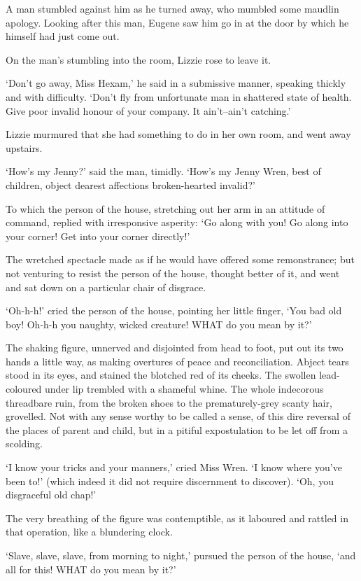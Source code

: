 A man stumbled against him as he turned away, who mumbled some maudlin
apology. Looking after this man, Eugene saw him go in at the door by
which he himself had just come out.

On the man’s stumbling into the room, Lizzie rose to leave it.

‘Don’t go away, Miss Hexam,’ he said in a submissive manner, speaking
thickly and with difficulty. ‘Don’t fly from unfortunate man in
shattered state of health. Give poor invalid honour of your company. It
ain’t--ain’t catching.’

Lizzie murmured that she had something to do in her own room, and went
away upstairs.

‘How’s my Jenny?’ said the man, timidly. ‘How’s my Jenny Wren, best of
children, object dearest affections broken-hearted invalid?’

To which the person of the house, stretching out her arm in an attitude
of command, replied with irresponsive asperity: ‘Go along with you! Go
along into your corner! Get into your corner directly!’

The wretched spectacle made as if he would have offered some
remonstrance; but not venturing to resist the person of the house,
thought better of it, and went and sat down on a particular chair of
disgrace.

‘Oh-h-h!’ cried the person of the house, pointing her little finger,
‘You bad old boy! Oh-h-h you naughty, wicked creature! WHAT do you mean
by it?’

The shaking figure, unnerved and disjointed from head to foot, put
out its two hands a little way, as making overtures of peace and
reconciliation. Abject tears stood in its eyes, and stained the blotched
red of its cheeks. The swollen lead-coloured under lip trembled with a
shameful whine. The whole indecorous threadbare ruin, from the broken
shoes to the prematurely-grey scanty hair, grovelled. Not with any sense
worthy to be called a sense, of this dire reversal of the places of
parent and child, but in a pitiful expostulation to be let off from a
scolding.

‘I know your tricks and your manners,’ cried Miss Wren. ‘I know where
you’ve been to!’ (which indeed it did not require discernment to
discover). ‘Oh, you disgraceful old chap!’

The very breathing of the figure was contemptible, as it laboured and
rattled in that operation, like a blundering clock.

‘Slave, slave, slave, from morning to night,’ pursued the person of the
house, ‘and all for this! WHAT do you mean by it?’

